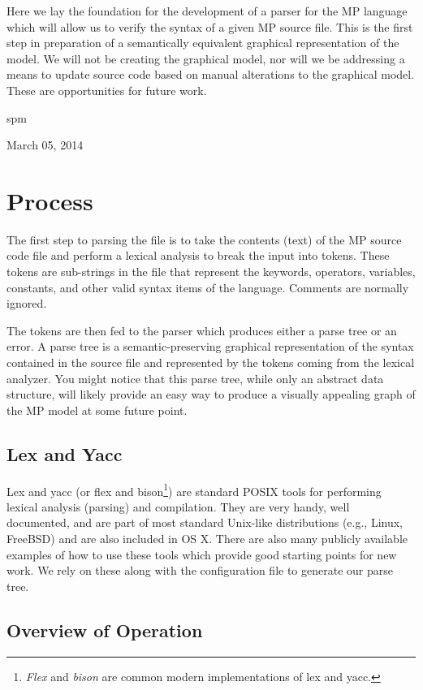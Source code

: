 \documentclass[journal]{IEEEtran}
\begin{document}
Here we lay the foundation for the development of a parser for the
MP language which will allow us to verify the syntax of a given MP source file. 
This is the first step in preparation of a semantically equivalent graphical
representation of the model.  We will not be creating the graphical model, nor will we
be addressing a means to update source code based on manual alterations to the
graphical model.  These are opportunities for future work.

\hfill spm
 
\hfill March 05, 2014

\section{Process}
The first step to parsing the file is to take the contents (text) of the 
MP source code file and perform a lexical analysis
to break the input into tokens.  These tokens are sub-strings in the file that 
represent the keywords, operators, variables, constants, and other valid syntax 
items of the language.  Comments are normally ignored.

The tokens are then fed to the parser which produces either a parse tree or an error.
A parse tree is a semantic-preserving graphical representation of the syntax contained
in the source file and represented by the tokens coming from the lexical analyzer.  You 
might notice that this parse tree, while only an abstract data structure, will likely provide an
easy way to produce a visually appealing graph of the MP model at some future point.


\subsection{Lex and Yacc}
Lex and yacc (or flex and bison\footnote{\emph{Flex} and \emph{bison}
are common modern implementations of lex and yacc.}) 
are standard POSIX tools for performing lexical analysis (parsing) and compilation.
They are very handy, well documented, and are part of most standard 
Unix-like distributions (e.g., Linux, FreeBSD) and are 
also included in OS X.  There are also many publicly available examples of how to use these
tools which provide good starting points for new work.  We rely on these along with the
configuration file to generate our parse tree.


\subsection{Overview of Operation}
\end{document}
